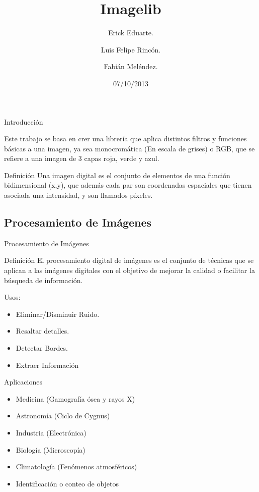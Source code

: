 \documentclass{beamer}
\title[Imagelib \hspace{25mm} \insertframenumber /20 ]{Imagelib}
\author{Erick Eduarte. \and  Luis Felipe Rincón. \and Fabián Meléndez.}
\institute{Universidad de Costa Rica}
\date{07/10/2013}
\begin{document}
\begin{frame}
  \titlepage
\end{frame}




\begin{frame}{Introducción}

Este trabajo se basa en crer una librería que aplica distintos filtros y funciones básicas a una imagen, ya sea monocromática (En escala de grises) o RGB, que se refiere a una imagen de 3 capas roja, verde y azul.


  \begin{block}{Definición}
  \justifying
 Una imagen digital es el conjunto de elementos de una función bidimensional (x,y), que además cada par son coordenadas espaciales que tienen asociada una intensidad, y son llamados píxeles.
 \end{block}


\end{frame}

\subsection{Procesamiento de Imágenes}



\begin{frame}{Procesamiento de Imágenes}

  \begin{block}{Definición}
  \justifying
  El procesamiento digital de imágenes es el conjunto de técnicas que se aplican a las imágenes digitales con el objetivo de mejorar la calidad o facilitar la búsqueda de información.
  \end{block}
  

\large{Usos:}
\begin{itemize}

\item Eliminar/Disminuir Ruido.
\item Resaltar detalles.
\item Detectar Bordes.
\item Extraer Información

\end{itemize}

\end{frame}


\begin{frame}{Aplicaciones}

\begin{itemize}

\item Medicina (Gamografía ósea y rayos X)
\item Astronomía (Ciclo de Cygnus)
\item Industria (Electrónica)
\item Biología (Microscopía)
\item Climatología (Fenómenos atmosféricos)
\item Identificación o conteo de objetos

\end{itemize}

\end{frame}
\end{document}
